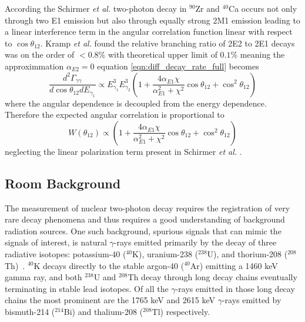 \documentclass[cnatzke_thesis_proposal.tex]{subfiles}
\begin{document}
According the Schirmer \textit{et al.} two-photon decay in $^{90}$Zr and $^{40}$Ca occurs not only through two E1 emission but also through equally strong 2M1 emission leading to a linear interference term in the angular correlation function linear with respect to $\cos\theta_{12}$. 
Kramp \textit{et al.} found the relative branching ratio of 2E2 to 2E1 decays was on the order of $<0.8\%$ with theoretical upper limit of $0.1\%$ meaning the approximmation $\alpha_{E2} = 0$ equation \ref{eqn:diff_decay_rate_full} becomes 
\begin{equation}
    \frac{d^2\Gamma_{\gamma\gamma}}{d \cos\theta_{12} dE_{\gamma_1}} \propto E_{\gamma_1}^3 E_{\gamma_2}^3 \left( 1 + \frac{4 \alpha_{E1} \chi}{\alpha_{E1}^2 + \chi^2} \cos\theta_{12} +  \cos^2\theta_{12} \right)
\end{equation}
where the angular dependence is decoupled from the energy dependence. Therefore the expected angular correlation is proportional to
\begin{equation} \label{eqn:angular-distribution}
   W(\theta_{12}) \propto \left( 1 + \frac{4 \alpha_{E1} \chi}{\alpha_{E1}^2 + \chi^2} \cos\theta_{12} +  \cos^2\theta_{12} \right)
\end{equation}
neglecting the linear polarization term present in Schirmer \textit{et al.} \cite{schirmer_double_1984}.

\subsection{Room Background}
\label{sec:room_background}
The measurement of nuclear two-photon decay requires the registration of very rare decay phenomena and thus requires a good understanding of background radiation sources. 
One such background, spurious signals that can mimic the signals of interest, is natural $\gamma$-rays emitted primarily by the decay of three radiative isotopes: potassium-40 ($^{40}$K), uranium-238 ($^{238}$U), and thorium-208 ($^{208}$Th)~\cite[]{aksoy_elemental_1994}.
$^{40}$K decays directly to the stable argon-40 ($^{40}$Ar) emitting a 1460 keV gamma ray, and both $^{238}$U and $^{208}$Th decay through long decay chains eventually terminating in stable lead isotopes. 
Of all the $\gamma$-rays emitted in those long decay chains the most prominent are the 1765 keV and 2615 keV $\gamma$-rays emitted by bismuth-214 ($^{214}$Bi) and thalium-208 ($^{208}$Tl) respectively.

\end{document}
